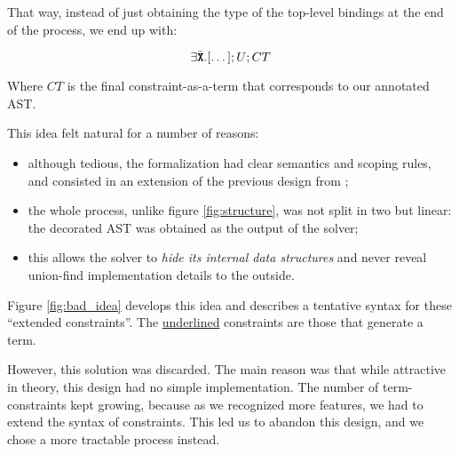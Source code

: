 \documentclass[10pt,a4paper,twoside,titlepage,twocolumn]{article}
\begin{document}
That way, instead of just obtaining the type of the top-level
bindings at the end of the process, we end up with:

$$\exists{\bar {{\textbf{\texttt{X}}}}}.[\dots]; U; CT$$

Where $CT$ is the final constraint-as-a-term that corresponds to our annotated AST.

This idea felt natural for a number of reasons:
\begin{itemize}
  \item although tedious, the formalization had clear semantics and scoping
    rules, and consisted in an extension of the previous design from
    \cite{pottier2005essence};
  \item the whole process, unlike figure \vref{fig:structure}, was not split in
    two but linear: the decorated AST was obtained as the output of the solver;
  \item this allows the solver to \emph{hide its internal data structures} and
    never reveal union-find implementation details to the outside.
\end{itemize}

Figure \vref{fig:bad_idea} develops this idea and describes a tentative syntax
for these ``extended constraints''. The \underline{underlined} constraints are
those that generate a term.

However, this solution was discarded. The main reason was that while attractive
in theory, this design had no simple implementation. The number of
term-constraints kept growing, because as we recognized more features, we had to
extend the syntax of constraints. This led us to abandon this design, and we
chose a more tractable process instead.
\end{document}
